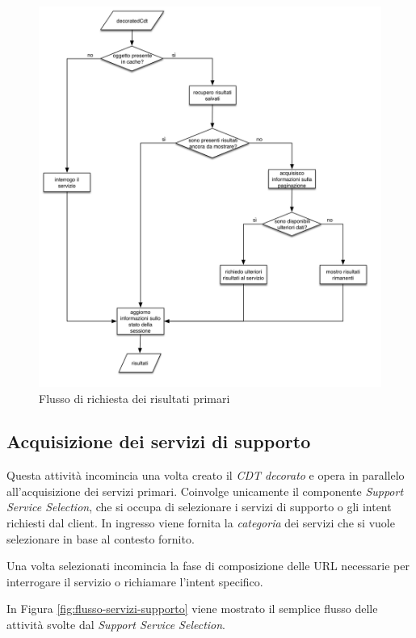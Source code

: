 \begin{figure}[ht]
	\centering
	\includegraphics[width=\textwidth]{5-implementazione-backend/Immagini/diagramma_flusso_servizi_primari.png}
	\caption{Flusso di richiesta dei risultati primari\label{fig:flusso-servizi-primari}}
\end{figure}

\subsection*{Acquisizione dei servizi di supporto}

Questa attività incomincia una volta creato il \emph{CDT decorato} e opera in parallelo all'acquisizione dei servizi primari. Coinvolge unicamente il componente \emph{Support Service Selection}, che si occupa di selezionare i servizi di supporto o gli intent richiesti dal client. In ingresso viene fornita la \emph{categoria} dei servizi che si vuole selezionare in base al contesto fornito.

Una volta selezionati incomincia la fase di composizione delle URL necessarie per interrogare il servizio o richiamare l'intent specifico.

In Figura \ref{fig:flusso-servizi-supporto} viene mostrato il semplice flusso delle attività svolte dal \emph{Support Service Selection}.
	
